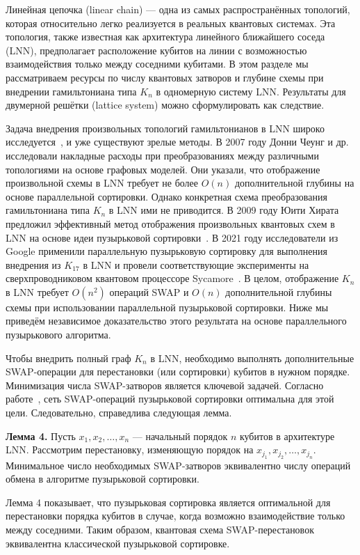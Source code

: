Линейная цепочка (linear chain) — одна из самых распространённых топологий,
которая относительно легко реализуется в реальных квантовых системах. Эта
топология, также известная как архитектура линейного ближайшего соседа (LNN),
предполагает расположение кубитов на линии с возможностью взаимодействия только
между соседними кубитами. В этом разделе мы рассматриваем ресурсы по числу
квантовых затворов и глубине схемы при внедрении гамильтониана типа $K_n$ в
одномерную систему LNN. Результаты для двумерной решётки (lattice system) можно
сформулировать как следствие.

Задача внедрения произвольных топологий гамильтонианов в LNN широко
исследуется~\cite{cite_53,cite_54,cite_55,cite_56,cite_57,cite_58,cite_59}, и
уже существуют зрелые методы. В 2007 году Донни Чеунг и др.~\cite{cite_55}
исследовали накладные расходы при преобразованиях между различными топологиями
на основе графовых моделей. Они указали, что отображение произвольной схемы в
LNN требует не более $O(n)$ дополнительной глубины на основе параллельной
сортировки. Однако конкретная схема преобразования гамильтониана типа $K_n$ в
LNN ими не приводится. В 2009 году Юити Хирата предложил эффективный метод
отображения произвольных квантовых схем в LNN на основе идеи пузырьковой
сортировки~\cite{cite_56}. В 2021 году исследователи из Google применили
параллельную пузырьковую сортировку для выполнения внедрения из $K_{17}$ в LNN
и провели соответствующие эксперименты на сверхпроводниковом квантовом
процессоре Sycamore~\cite{cite_11}. В целом, отображение $K_n$ в LNN требует
$O(n^2)$ операций SWAP и $O(n)$ дополнительной глубины схемы при использовании
параллельной пузырьковой сортировки. Ниже мы приведём независимое
доказательство этого результата на основе параллельного пузырькового алгоритма.

Чтобы внедрить полный граф $K_n$ в LNN, необходимо выполнять дополнительные
SWAP-операции для перестановки (или сортировки) кубитов в нужном порядке.
Минимизация числа SWAP-затворов является ключевой задачей. Согласно
работе~\cite{cite_56}, сеть SWAP-операций пузырьковой сортировки оптимальна для
этой цели. Следовательно, справедлива следующая лемма.

\textbf{Лемма 4.} Пусть $x_1, x_2, \dots, x_n$ — начальный порядок $n$ кубитов
в архитектуре LNN. Рассмотрим перестановку, изменяющую порядок на $x_{j_1},
x_{j_2}, \dots, x_{j_n}$. Минимальное число необходимых SWAP-затворов
эквивалентно числу операций обмена в алгоритме пузырьковой сортировки.

Лемма 4 показывает, что пузырьковая сортировка является оптимальной для
перестановки порядка кубитов в случае, когда возможно взаимодействие только
между соседними. Таким образом, квантовая схема SWAP-перестановок эквивалентна
классической пузырьковой сортировке.


